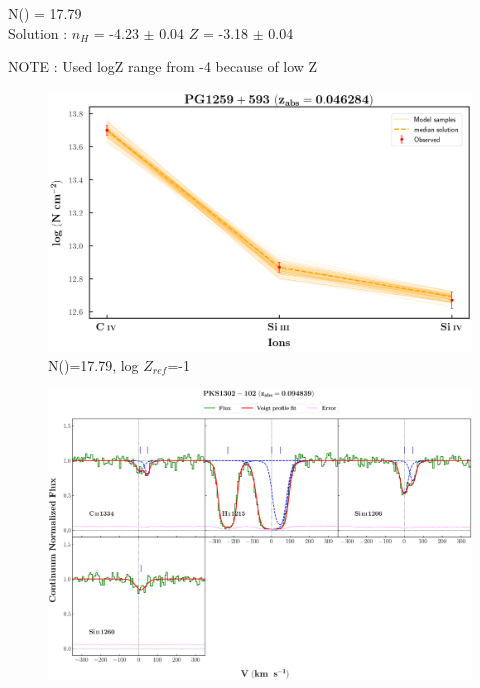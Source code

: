 \documentclass[12pt,draft]{report}
\newcommand\ion[2]{\text{#1\,\textsc{\lowercase{#2}}}}
\begin{document}
N(\ion{H}{I}) = 17.79   \\ 

Solution : $n_H$ = -4.23 $\pm$ 0.04 \hspace{10mm} $Z$ = -3.18 $\pm$ 0.04 \newline

NOTE : Used logZ range from -4 because of low Z

\begin{figure}[!htbp]
    \centering
    \includegraphics[width=0.8\linewidth]{Ionisation-Modelling-Plots/pg1259-z=0.046284-compII_logZ=-1.png}
    \caption{N(\ion{H}{i})=17.79, log $Z_{ref}$=-1}
\end{figure}


\newpage

\begin{landscape}

\begin{figure}
    \centering
    \vspace{-20mm}
    \hspace*{-35mm}
    \includegraphics[width=1.25\linewidth]{System-Plots/PKS1302-102_z=0.094839_sys_plot.png}
\end{figure}

\end{landscape}
\end{document}
